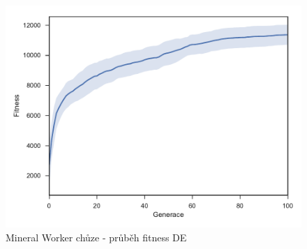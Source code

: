 \begin{figure}[t]\centering
	\includegraphics[width=\columnwidth]{../img/MineralMap/MineralWorkerWalk}
	\caption{Mineral Worker chůze -  průběh fitness DE}
	\label{obr04:MineralWorkerWalk}
\end{figure}
\clearpage

